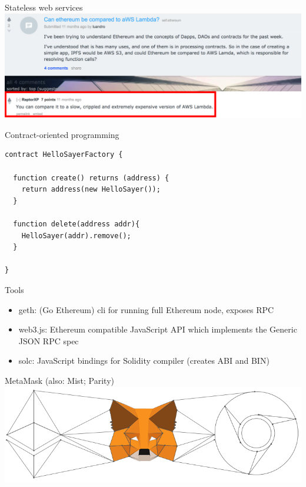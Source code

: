 \documentclass[presentation]{beamer}
\begin{document}
\begin{frame}[label=sec-2-4]{Stateless web services}
\includegraphics[width=.9\linewidth]{../images/awslambda.png}
\end{frame}

\begin{frame}[fragile,label=sec-2-5]{Contract-oriented programming}
 \begin{verbatim}
contract HelloSayerFactory {

  function create() returns (address) {
    return address(new HelloSayer());
  }

  function delete(address addr){
    HelloSayer(addr).remove();
  }

}
\end{verbatim}
\end{frame}

\begin{frame}[label=sec-2-6]{Tools}
\begin{itemize}
\item geth: (Go Ethereum) \alert{cli} for running full Ethereum node, exposes RPC
\item web3.js: Ethereum compatible \alert{JavaScript API} which implements the Generic \alert{JSON RPC spec}
\item solc: JavaScript bindings for Solidity compiler (creates \alert{ABI} and \alert{BIN})
\end{itemize}
\end{frame}

\begin{frame}[label=sec-2-7]{MetaMask (also: Mist; Parity)}
\includegraphics[width=.9\linewidth]{../images/metamask.png}
\end{frame}
\end{document}
